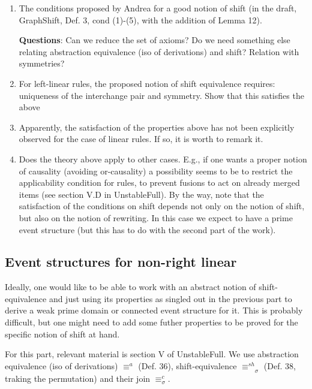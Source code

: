 \documentclass{llncs}
\newcommand{\shifteq}[1][]{\ensuremath{\mathrel{{\equiv}^\mathit{sh}_{#1}}}}
\begin{document}
\begin{enumerate}
\item The conditions proposed by Andrea for a good notion of shift (in
  the draft, GraphShift, Def. 3, cond (1)-(5), with the addition of
  Lemma 12).
  
  \textbf{Questions}: Can we reduce the set of axioms? Do we need something else relating abstraction equivalence (iso of derivations) and shift? Relation with symmetries? 

  
  
\item For left-linear rules, the proposed notion of shift equivalence
  requires: uniqueness of the interchange pair and symmetry. Show that
  this satisfies the above

\item Apparently, the satisfaction of the properties above has not
  been explicitly observed for the case of linear rules. If so, it is
  worth to remark it.

\item Does the theory above apply to other cases. E.g., if one wants a
  proper notion of causality (avoiding or-causality) a possibility
  seems to be to restrict the applicability condition for rules, to
  prevent fusions to act on already merged items (see section V.D in
  UnstableFull). By the way, note that the satisfaction of the conditions
  on shift depends not only on the notion of shift, but also on the
  notion of rewriting. In this case we expect to have a prime event
  structure (but this has to do with the second part of the work).
  
  
\end{enumerate}


\subsection*{Event structures for non-right linear}


Ideally, one would like to be able to work with an abstract notion of
shift-equivalence and just using its properties as singled out in the
previous part to derive a weak prime domain or connected event structure
for it. This is probably difficult, but one might need to add some
futher properties to be proved for the specific notion of shift at
hand.


For this part, relevant material is section V of UnstableFull. We use abstraction equivalence (iso of derivations) $\equiv^{a}$ (Def. 36), shift-equivalence $\shifteq_\sigma$ (Def. 38, traking the permutation) and their join $\equiv^c_\sigma$.
\end{document}
